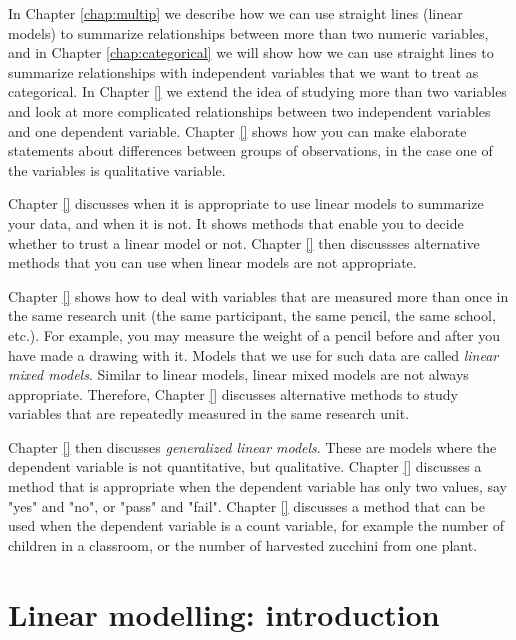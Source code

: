 \documentclass[]{book}\usepackage[]{graphicx}\usepackage[]{color}
\begin{document}
In Chapter \ref{chap:multip} we describe how we can use straight lines (linear models) to summarize relationships between more than two numeric variables, and in Chapter \ref{chap:categorical} we will show how we can use straight lines to summarize relationships with independent variables that we want to treat as categorical. In Chapter \ref{} we extend the idea of studying more than two variables and look at more complicated relationships between two independent variables and one dependent variable. Chapter \ref{} shows how you can make elaborate statements about differences between groups of observations, in the case one of the variables is qualitative variable.

Chapter \ref{} discusses when it is appropriate to use linear models to summarize your data, and when it is not. It shows methods that enable you to decide whether to trust a linear model or not. Chapter \ref{} then discussses alternative methods that you can use when linear models are not appropriate.

Chapter \ref{} shows how to deal with variables that are measured more than once in the same research unit (the same participant, the same pencil, the same school, etc.). For example, you may measure the weight of a pencil before and after you have made a drawing with it. Models that we use for such data are called \textit{linear mixed models}. Similar to linear models, linear mixed models are not always appropriate. Therefore, Chapter \ref{} discusses alternative methods to study variables that are repeatedly measured in the same research unit.

Chapter \ref{} then discusses \textit{generalized linear models}. These are models where the dependent variable is not quantitative, but qualitative. Chapter \ref{} discusses a method that is appropriate when the dependent variable has only two values, say "yes" and "no", or "pass" and "fail". Chapter \ref{} discusses a method that can be used when the dependent variable is a count variable, for example the number of children in a classroom, or the number of harvested zucchini from one plant.













\chapter{Linear modelling: introduction}\label{chap:simple}
\end{document}

